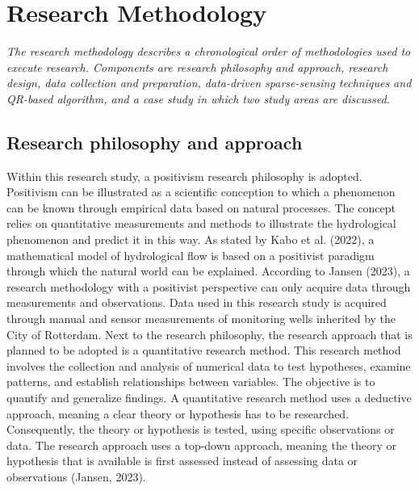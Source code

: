\chapter{Research Methodology}
\emph{The research methodology describes a chronological order of methodologies used to execute research. Components are research philosophy and approach, research design, data collection and preparation, data-driven sparse-sensing techniques and QR-based algorithm, and a case study in which two study areas are discussed.}

\section{Research philosophy and approach}
Within this research study, a positivism research philosophy is adopted. Positivism can be illustrated as a scientific conception to which a phenomenon can be known through empirical data based on natural processes. The concept relies on quantitative measurements and methods to illustrate the hydrological phenomenon and predict it in this way. As stated by Kabo et al. (2022), a mathematical model of hydrological flow is based on a positivist paradigm through which the natural world can be explained. According to Jansen (2023), a research methodology with a positivist perspective can only acquire data through measurements and observations. Data used in this research study is acquired through manual and sensor measurements of monitoring wells inherited by the City of Rotterdam. Next to the research philosophy, the research approach that is planned to be adopted is a quantitative research method. This research method involves the collection and analysis of numerical data to test hypotheses, examine patterns, and establish relationships between variables. The objective is to quantify and generalize findings. A quantitative research method uses a deductive approach, meaning a clear theory or hypothesis has to be researched. Consequently, the theory or hypothesis is tested, using specific observations or data. The research approach uses a top-down approach, meaning the theory or hypothesis that is available is first assessed instead of assessing data or observations (Jansen, 2023). 
\newpage
